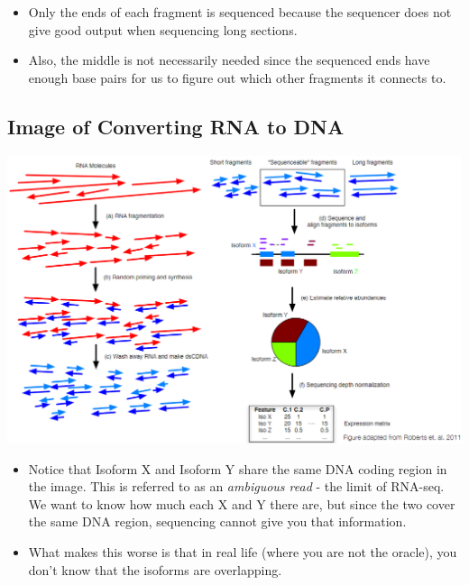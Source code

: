 \documentclass[10pt]{article}
\begin{document}
\begin{itemize}
    \item Only the ends of each fragment is sequenced because the sequencer does not give good output when sequencing long sections.
    \item Also, the middle is not necessarily needed since the sequenced ends have enough base pairs for us to figure out which other fragments it connects to.
\end{itemize}

\subsection*{Image of Converting RNA to DNA}
\begin{center}
    \includegraphics*[scale=0.8]{W3_3.png}
\end{center}
\begin{itemize}
    \item Notice that Isoform X and Isoform Y share the same DNA coding region in the image.  This is referred to as an \textit{ambiguous read} - the limit of RNA-seq.  We want to know how much each X and Y there are, but since the two cover the same DNA region, sequencing cannot give you that information.
    \item What makes this worse is that in real life (where you are not the oracle), you don't know that the isoforms are overlapping.
\end{itemize}
\end{document}
